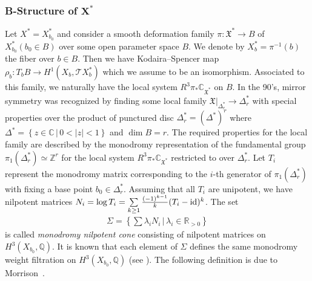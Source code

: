 \documentclass[pdftex]{sigma}
\numberwithin{equation}{section}
\begin{document}
\subsubsection[B-Structure of $X^*$]{B-Structure of $\boldsymbol{X^*}$} Let $X^{*}=X_{b_{0}}^{*}$ and consider
a smooth deformation family $\pi\colon \mathfrak{X}^{*}\to B$ of $X_{b_{0}}^{*}(b_{0}\in B)$ over some open parameter space $B$. We denote by $X_{b}^{*}=\pi^{-1}(b)$ the fiber over $b\in B$. Then we have Kodaira--Spencer map $\rho_{b}\colon T_{b}B\to H^{1}(X_{b},\mathcal{T}X_{b}^{*})$
which we assume to be an isomorphism. Associated to this family, we naturally have the local system $R^{3}\pi_{*}\mathbb{C}_{\mathfrak{X}^{*}}$
on $B$. In the 90's, mirror symmetry was recognized by finding some local family $\mathfrak{X}|_{\Delta_{r}^{*}}\to\Delta_{r}^{*}$ with special
properties over the product of punctured disc $\Delta_{r}^{*}=(\Delta^{*})^{r}$ where $\Delta^{*}=\left\{ z\in\mathbb{C}\,|\,0<|z|<1\right\} $ and
$\dim B=r$. The required properties for the local family are described by the monodromy representation of the fundamental group $\pi_{1}(\Delta_{r}^{*})\simeq\mathbb{Z}^{r}$ for the local system $R^{3}\pi_{*}\mathbb{C}_{\mathfrak{X}^{*}}$ restricted to over $\Delta_{r}^{*}$. Let $T_{i}$ represent the monodromy matrix corresponding to the $i$-th generator of $\pi_{1}(\Delta_{r}^{*})$ with fixing a base point $b_{0}\in\Delta_{r}^{*}$. Assuming that all $T_{i}$ are unipotent, we have nilpotent matrices $N_{i}=\log T_{i}=\sum\limits_{k\geq1}\frac{(-1)^{k-1}}{k}(T_{i}-{\rm id})^{k}$. The set
\begin{gather}
\Sigma=\left\{ \sum\lambda_{i}N_{i}\,|\,\lambda_{i}\in\mathbb{R}_{>0}\right\} \label{eq:Mon-cone-Sig}
\end{gather}
is called \textit{monodromy nilpotent cone} consisting of nilpotent matrices on $H^{3}(X_{b_{0}},\mathbb{\mathbb{Q}})$. It is known that each element of $\Sigma$ defines the same monodromy weight filtration on $H^{3}(X_{b_{0}},\mathbb{Q})$ (see \cite[Theorem~1.9]{Griffiths}). The following definition is due to Morrison~\cite{MoLCSL}.
\end{document}
